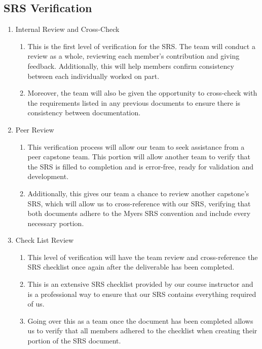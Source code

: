 \documentclass[12pt, titlepage]{article}
\begin{document}
\subsection{SRS Verification}

\begin{enumerate}
\item Internal Review and Cross-Check
\begin{enumerate}
\item This is the first level of verification for the SRS. The team
will conduct a review as a whole, reviewing each member’s contribution
and giving feedback. Additionally, this will help members confirm
consistency between each individually worked on part.
\item Moreover, the team will also be given the opportunity to
cross-check with the requirements listed in any previous documents
to ensure there is consistency between documentation.
\end{enumerate}

\item Peer Review
\begin{enumerate}
\item This verification process will allow our team to seek assistance from
a peer capstone team. This portion will allow another team to verify that the
SRS is filled to completion and is error-free, ready for validation
and development.
\item Additionally, this gives our team a chance to review another capstone’s
SRS, which will allow us to cross-reference with our SRS, verifying that
both documents adhere to the Myers SRS convention and include every necessary portion.
\end{enumerate}

\item Check List Review
\begin{enumerate}
\item This level of verification will have the team review
 and cross-reference the SRS checklist once again after
 the deliverable has been completed.
\item This is an extensive SRS checklist provided by our
course instructor and is a professional way to ensure
that our SRS contains everything required of us.
\item Going over this as a team once the document has
been completed allows us to verify that all members
adhered to the checklist when creating their portion
of the SRS document.
\end{enumerate}
\end{enumerate}
\end{document}

